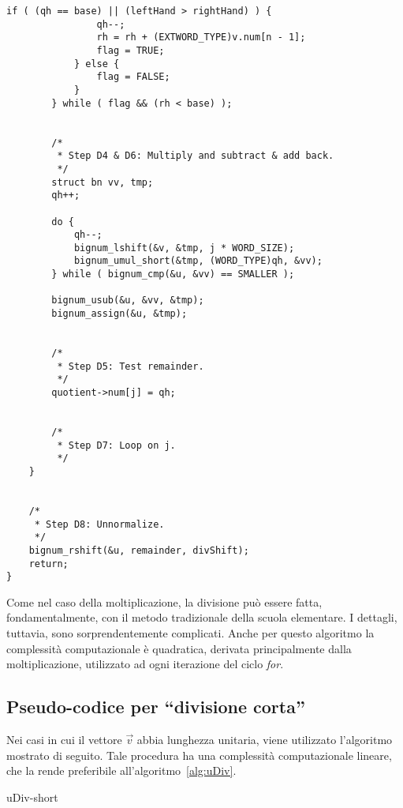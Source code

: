\begin{lstlisting}[basicstyle=\ttfamily\small, backgroundcolor=\color{bgCode}]
            if ( (qh == base) || (leftHand > rightHand) ) {
                qh--;
                rh = rh + (EXTWORD_TYPE)v.num[n - 1];
                flag = TRUE;
            } else {
                flag = FALSE;
            }
        } while ( flag && (rh < base) );
        
        
        /*
         * Step D4 & D6: Multiply and subtract & add back.
         */
        struct bn vv, tmp;
        qh++;
        
        do {
            qh--;
            bignum_lshift(&v, &tmp, j * WORD_SIZE);
            bignum_umul_short(&tmp, (WORD_TYPE)qh, &vv);
        } while ( bignum_cmp(&u, &vv) == SMALLER );
        
        bignum_usub(&u, &vv, &tmp);
        bignum_assign(&u, &tmp);
        
        
        /*
         * Step D5: Test remainder.
         */
        quotient->num[j] = qh;
        
        
        /*
         * Step D7: Loop on j.
         */
    }
    
    
    /*
     * Step D8: Unnormalize.
     */
    bignum_rshift(&u, remainder, divShift);
    return;
}
\end{lstlisting}

Come nel caso della moltiplicazione, la divisione può essere fatta, fondamentalmente, con il metodo tradizionale della scuola elementare. I dettagli, tuttavia, sono sorprendentemente complicati. Anche per questo algoritmo la complessità computazionale è quadratica, derivata principalmente dalla moltiplicazione, utilizzato ad ogni iterazione del ciclo \emph{for}.

%
\subsection{Pseudo-codice per ``divisione corta''}
%

Nei casi in cui il vettore $\vec{v}$ abbia lunghezza unitaria, viene utilizzato l'algoritmo mostrato di seguito. Tale procedura ha una complessità computazionale lineare, che la rende preferibile all'algoritmo~\ref{alg:uDiv}.

\begin{algorithm}[H]
	\caption{uDiv-short}
	\label{alg:uDiv-short}
	\DontPrintSemicolon
\end{algorithm}

